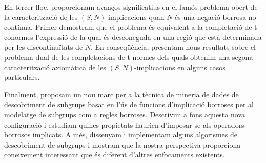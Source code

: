 En tercer lloc, proporcionam avanços significatius en el famós problema obert de la caracterització de les $(S,N)$-implicacions quan $N$ és una negació borrosa no contínua. Primer demostram que el problema és equivalent a la completació de t-conormes l'expressió de la qual és desconeguda en una regió que està determinada per les discontinuïtats de $N$. En conseqüència, presentam nous resultats sobre el problema dual de les completacions de t-normes dels quals obtenim una segona caracterització axiomàtica de les $(S,N)$-implicacions en alguns casos particulars.

Finalment, proposam un nou marc per a la tècnica de mineria de dades de descobriment de subgrups basat en l'ús de funcions d'implicació borroses per al modelatge de subgrups com a regles borroses. Descrivim a fons aquesta nova configuració i estudiam quines propietats haurien d'imposar-se als operadors borrosos implicats. A més, dissenyam i implementam alguns algorismes de descobriment de subgrups i mostram que la nostra perspectiva proporciona coneixement interessant que és diferent d'altres enfocaments existents.


